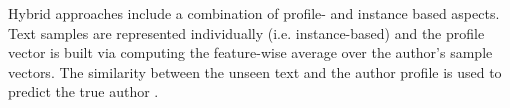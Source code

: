 Hybrid approaches include a combination of profile- and instance based aspects.
Text samples are represented individually (i.e. instance-based) and 
the profile vector is built via computing the feature-wise average over the author's sample vectors.
The similarity between the unseen text and the author profile is used to predict the true author \citep{stamatatos_survey_2009}.
